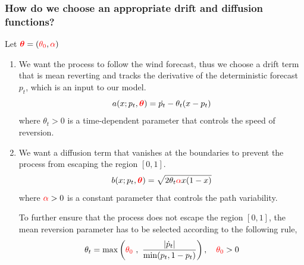 \documentclass[aspectratio=169]{beamer}\usepackage[utf8]{inputenc}
\begin{document}
\begin{frame}\frametitle{How do we choose an appropriate drift and diffusion functions?}

Let $\textcolor{red}{ \bm{\theta} }= (\textcolor{red}{\theta_0}, \textcolor{red}{\alpha})$
\begin{enumerate}
  \item We want the process to follow the wind forecast, thus we choose a drift term that is mean reverting and tracks the derivative of the deterministic forecast $p_t$, which is an input to our model.
  \begin{equation}
    a(x; p_t,\textcolor{red}{ \bm{\theta} })=  \dot{p_t} - \theta_t(x - p_t)
  \end{equation}
where $\theta_t>0$ is a time-dependent parameter that controls the speed of reversion.
  \item We want a diffusion term that vanishes at the boundaries to prevent the process from escaping the region $[0,1]$.
  \begin{equation}
    b (x; p_t,\textcolor{red}{ \bm{\theta} } )= \sqrt{2 \theta_t \textcolor{red}{\textcolor{red}{\alpha}} x (1-x)}
  \end{equation}
  where $\textcolor{red}{\alpha} >0$ is a constant parameter that controls the path variability.

To further ensure that the process does not escape the region $[0,1]$, the mean reversion parameter has to be selected according to the following rule,
\begin{equation}
\theta_t = \max \left( \textcolor{red}{\theta_0} \ , \ \frac{|\dot{p}_t|}{\min (p_t, 1-p_t)}  \right ),  \quad \textcolor{red}{\theta_0} >0 \label{theta_t}
\end{equation}
\end{enumerate}
\end{frame}
\end{document}
